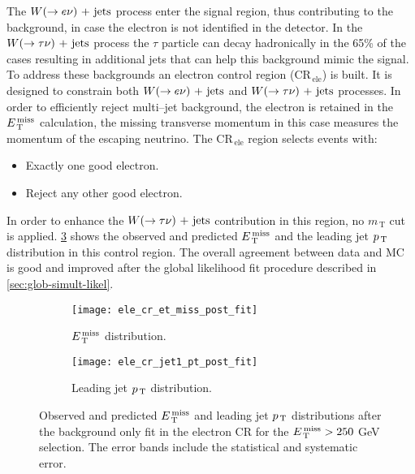 The $W (\rightarrow e \nu)\mathrm{~+~jets}$ process enter the signal region, thus contributing to the
background, in case the electron is not identified in the detector. In the
$W (\rightarrow \tau \nu)\mathrm{~+~jets}$ process the $\tau$ particle can decay hadronically in the 65\%
of the cases resulting in additional jets that can help this background mimic
the signal. To address these backgrounds an electron control region
(CR$_\mathrm{\, ele}$) is built. It is designed to constrain both
$W (\rightarrow e \nu)\mathrm{~+~jets}$ and $W (\rightarrow \tau \nu)\mathrm{~+~jets}$ processes. In order to efficiently reject
multi--jet background, the electron is retained in the $E_\mathrm{\, T}^\mathrm{\, miss}$ calculation, the
missing transverse momentum in this case measures the momentum of the escaping
neutrino. The CR$_\mathrm{\, ele}$ region selects events with:
\begin{itemize}
\item Exactly one good electron.
\item Reject any other good electron.
\end{itemize}
In order to enhance the $W (\rightarrow \tau \nu)\mathrm{~+~jets}$ contribution in this region, no
$m_\mathrm{\, T}$ cut is applied. \cref{fig:ele_cr_plots} shows the observed and
predicted $E_\mathrm{\, T}^\mathrm{\, miss}$ and the leading jet $p_\mathrm{\, T}$ distribution in this control region. The
overall agreement between data and MC is good and improved after the global
likelihood fit procedure described in \cref{sec:glob-simult-likel}.

\begin{figure}[!h]
  \centering
  \begin{subfigure}[t]{.48\linewidth}
    \texttt{[image: ele\_cr\_et\_miss\_post\_fit]}
    \caption{$E_\mathrm{\, T}^\mathrm{\, miss}$ distribution.}
    \label{fig:ele_cr_et_miss_pre_fit}
  \end{subfigure}
  \begin{subfigure}[t]{.48\linewidth}
    \texttt{[image: ele\_cr\_jet1\_pt\_post\_fit]}
    \caption{Leading jet $p_\mathrm{\, T}$ distribution.}
    \label{fig:ele_cr_jet1_pt_pre_fit}
  \end{subfigure}
  \caption{Observed and predicted $E_\mathrm{\, T}^\mathrm{\, miss}$ and leading jet $p_\mathrm{\, T}$ distributions
    after the background only fit in the electron CR for the $E_\mathrm{\, T}^\mathrm{\, miss} > 250~$GeV
    selection. The error bands include the statistical and systematic error.}
  \label{fig:ele_cr_plots}
\end{figure}
